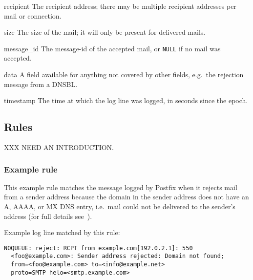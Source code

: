 \begin{eqlist}
    \item [recipient] The recipient address; there may be multiple
        recipient addresses per mail or connection.

    \item [size] The size of the mail; it will only be present for
        delivered mails.

    \item [message\_id] The message-id of the accepted mail, or
        \texttt{NULL} if no mail was accepted.

    \item [data] A field available for anything not covered by other
        fields, e.g.\ the rejection message from a \gls{DNSBL}\@.

    \item [timestamp] The time at which the log line was logged, in seconds
        since the epoch.

\end{eqlist}



\subsection{Rules}

\label{rules}

XXX NEED AN INTRODUCTION\@.

\subsubsection{Example rule}

\label{example rule}

This example rule matches the message logged by Postfix when it rejects
mail from a sender address because the domain in the sender address does
not have an A, AAAA, or MX DNS entry, i.e.\ mail could not be delivered
to the sender's address (for full details
see~\cite{reject-unknown-sender-domain}).

Example log line matched by this rule:


\begin{verbatim}
NOQUEUE: reject: RCPT from example.com[192.0.2.1]: 550
  <foo@example.com>: Sender address rejected: Domain not found;
  from=<foo@example.com> to=<info@example.net>
  proto=SMTP helo=<smtp.example.com>
\end{verbatim}

